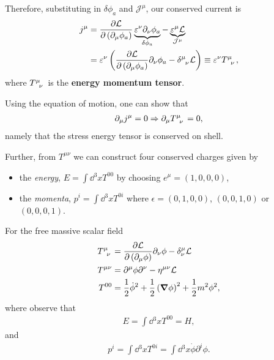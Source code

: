 Therefore, substituting in $\delta \phi_a$ and $\mathcal{J}^{\mu}$, our conserved current is
\begin{align}
    j^{\mu} &= \pdv{\mathcal{L}}{\left( \partial_\mu \phi_a \right) } \underbrace{\epsilon^{\nu} \partial_\nu \phi_a}_{\delta \phi_a} - \underbrace{\epsilon^{\mu} \mathcal{L}}_{\mathcal{J}^{\mu}} \\
    &= \epsilon^{\nu} \left( \pdv{\mathcal{L}}{\left( \partial_\mu \phi_a \right) } \partial_\nu \phi_a - \tensor{\delta}{^{\mu}_\nu} \mathcal{L}\right)  \equiv \epsilon^{\nu} \tensor{T}{^{\mu}_\nu}
,\end{align}
where $\tensor{T}{^{\mu}_{\nu}}$ is the \textbf{energy momentum tensor}.

Using the equation of motion, one can show that
\begin{align}
    \partial_\mu j^{\mu} = 0 \implies \partial_\mu \tensor{T}{^{\mu}_\nu} = 0
,\end{align}
namely that the stress energy tensor is conserved on shell. 

Further, from $T^{\mu \nu}$ we can construct four conserved charges given by
\begin{itemize}
    \item the \textit{energy}, $E = \int \dd{^3x} T^{00}$ by choosing $e^{\mu} = \left( 1,0,0,0 \right) $,
    \item the \textit{momenta}, $p^{i} = \int \dd{^3x} T^{0i}$ where $\epsilon = \left( 0,1,0,0 \right) $, $\left( 0,0,1,0 \right) $ or $\left( 0,0,0,1 \right) $.
\end{itemize}

\begin{example}
    For the free massive scalar field
    \begin{align}
        \tensor{T}{^{\mu}_{\nu}} &= \pdv{\mathcal{L}}{\left( \partial_\mu \phi \right) } \partial_\nu \phi - \delta^{\mu}_\nu \mathcal{L} \\
        T^{\mu \nu} &= \partial^{\mu} \phi \partial^{\nu} - \eta^{\mu \nu} \mathcal{L} \\
        T^{00} &= \frac{1}{2} \dot{\phi}^2 + \frac{1}{2} \left( \grad \phi \right)^2 + \frac{1}{2} m^2 \phi^2
    ,\end{align}
    where observe that
    \begin{align}
        E = \int \dd{^3x} T^{00} = H
    ,\end{align}
    and
    \begin{align}
        p^{i} = \int \dd{^3x} T^{0i} = \int \dd{^3x} \dot{\phi} \partial^{i} \phi
    .\end{align}
\end{example}

